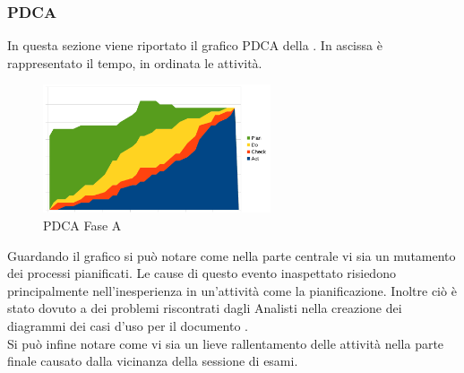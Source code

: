 		\subsubsection{PDCA}
			In questa sezione viene riportato il grafico PDCA della . In ascissa è rappresentato il tempo, in ordinata le attività.
			\begin{figure}[H]
				\centering
				\includegraphics[width=0.6\textwidth]{PianoDiQualifica/Pics/GraficoPDCAFaseA.pdf}
				\caption{PDCA Fase A}
			\end{figure}
			Guardando il grafico si può notare come nella parte centrale vi sia un mutamento dei processi pianificati. Le cause di questo evento 
			inaspettato	risiedono principalmente nell'inesperienza in un'attività come la pianificazione. Inoltre ciò è stato dovuto a dei problemi 
			riscontrati dagli Analisti nella creazione dei diagrammi dei casi d'uso per il documento .\\
			Si può infine notare come vi sia un lieve rallentamento delle attività nella parte finale causato dalla vicinanza della sessione di esami.
